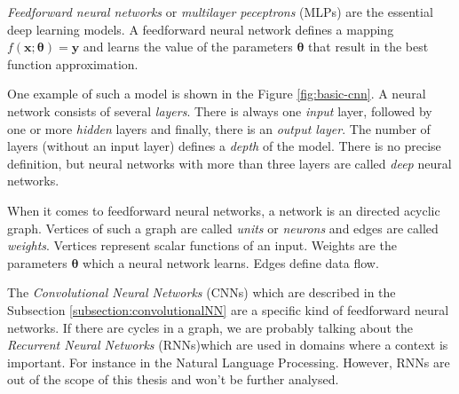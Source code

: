 
\textit{Feedforward neural networks} or \textit{multilayer peceptrons} (MLPs) are the essential deep learning models. A feedforward neural network defines a mapping $f (\pmb{x} ; \pmb{\theta}) = \pmb{y}$ and learns the value of the parameters $\pmb{\theta}$ that result in the best function approximation.

One example of such a model is shown in the Figure \ref{fig:basic-cnn}. A neural network consists of several \textit{layers}. There is always one \textit{input} layer, followed by one or more \textit{hidden} layers and finally, there is an \textit{output layer}. The number of layers (without an input layer) defines a \textit{depth} of the model. There is no precise definition, but neural networks with more than three layers are called \textit{deep} neural networks. 

When it comes to feedforward neural networks, a network is an directed acyclic graph. Vertices of such a graph are called \textit{units} or \textit{neurons} and edges are called \textit{weights}. Vertices represent scalar functions of an input. Weights are the parameters $\pmb \theta$ which a neural network learns. Edges define data flow.

The \textit{Convolutional Neural Networks} (CNNs) which are described in the Subsection \ref{subsection:convolutionalNN} are a specific kind of feedforward neural networks. If there are cycles in a graph, we are probably talking about the \textit{Recurrent Neural Networks} (RNNs)which are used in domains where a context is important. For instance in the Natural Language Processing. However, RNNs are out of the scope of this thesis and won't be further analysed.

